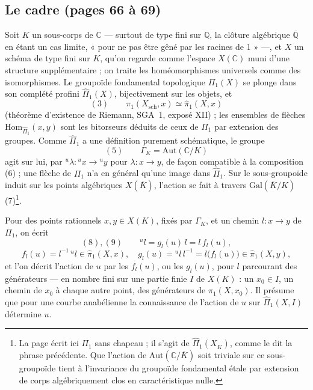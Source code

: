 \documentclass[11pt,a4paper]{article}
\begin{document}
\subsection*{Le cadre (pages 66 à 69)}

Soit $K$ un sous-corps de $\mathbb{C}$ — surtout de type fini sur
$\mathbb{Q}$, la clôture algébrique $\overline{\mathbb{Q}}$ en étant un cas
limite, « pour ne pas être gêné par les racines de 1 » —, et $X$ un schéma de
type fini sur $K$, qu'on regarde comme l'espace $X(\mathbb{C})$ muni d'une
structure supplémentaire ; on traite les homéomorphismes universels comme des
isomorphismes. Le groupoïde fondamental topologique $\Pi_1(X)$ se plonge dans
son complété profini $\widehat\Pi_1(X)$, bijectivement sur les objets, et
\[
(3)\qquad \pi_1(X_{\mathrm{sch}}, x) \simeq \widehat\pi_1(X, x)
\]
(théorème d'existence de Riemann, SGA~1, exposé XII) ; les ensembles de
flèches $\mathrm{Hom}_{\widehat\Pi_1}(x, y)$ sont les bitorseurs déduits de
ceux de $\Pi_1$ par extension des groupes. Comme $\widehat\Pi_1$ a une
définition purement schématique, le groupe
\[
(5)\qquad \Gamma_K = \mathrm{Aut}(\mathbb{C}/K)
\]
agit sur lui, par ${}^{u}\lambda : {}^{u}x \to {}^{u}y$ pour $\lambda : x \to y$,
de façon compatible à la composition (6) ; une flèche de $\Pi_1$ n'a en
général qu'une image dans $\widehat\Pi_1$. Sur le sous-groupoïde induit sur
les points algébriques $X(\overline{K})$, l'action se fait à travers
$\mathrm{Gal}(\overline{K}/K)$ (7)\footnote{La page écrit ici $\Pi_1$ sans
chapeau ; il s'agit de $\widehat\Pi_1(X_{\overline{K}})$, comme le dit la
phrase précédente. Que l'action de $\mathrm{Aut}(\mathbb{C}/\overline{K})$
soit triviale sur ce sous-groupoïde tient à l'invariance du groupoïde
fondamental étale par extension de corps algébriquement clos en
caractéristique nulle.}.

Pour des points rationnels $x, y \in X(K)$, fixés par $\Gamma_K$, et un chemin
$l : x \to y$ de $\Pi_1$, on écrit
\[
(8),(9)\qquad {}^{u}l = g_l(u)\, l = l\, f_l(u),
\]
\[
f_l(u) = l^{-1}\,{}^{u}l \in \widehat\pi_1(X, x), \quad g_l(u) = {}^{u}l\, l^{-1} = l\bigl(f_l(u)\bigr) \in \widehat\pi_1(X, y),
\]
et l'on décrit l'action de $u$ par les $f_l(u)$, ou les $g_l(u)$, pour $l$
parcourant des générateurs — en nombre fini sur une partie finie $I$ de
$X(K)$ : un $x_0 \in I$, un chemin de $x_0$ à chaque autre point, des
générateurs de $\pi_1(X, x_0)$. Il présume que pour une courbe anabélienne la
connaissance de l'action de $u$ sur $\widehat\Pi_1(X, I)$ détermine $u$.
\end{document}
